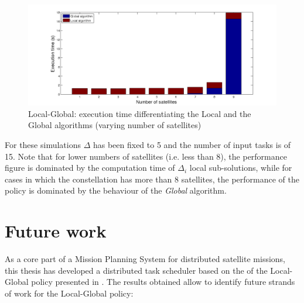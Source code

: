 \begin{figure}[h!]
  \begin{minipage}[b]{\linewidth}
    \includegraphics[width=\linewidth]{Figures/local_global.png}
    \caption{%
Local-Global: execution time differentiating the Local and the Global algorithms (varying number of satellites)} %
\label{fig_local_global}
  \end{minipage}
  \end{figure}

For these simulations $\Delta$ has been fixed to 5 and the number of input tasks is of 15. Note that for lower numbers of satellites (i.e. less than 8), the performance figure is dominated by the computation time of $\Delta_i$ local sub-solutions, while for cases in which the constellation has more than 8 satellites, the performance of the policy is dominated by the behaviour of the \textit{Global} algorithm.

\section{Future work}

As a core part of a Mission Planning System for distributed satellite missions, this thesis has developed a distributed task scheduler based on the of the Local-Global policy presented in \cite{Araguz15}. The results obtained allow to identify future strands of work for the Local-Global policy:

